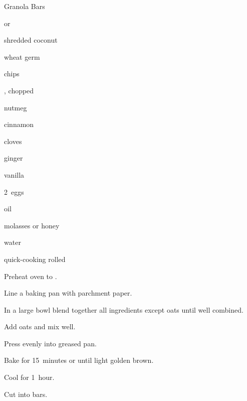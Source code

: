 \begin{recipe}{Granola Bars}{}{}

\begin{ingredients}
\item \C{\half}  or 
\item \C{\half} shredded coconut
\item \C{\quarter} wheat germ
\item \C{\quarter}  chips
\item \C{\quarter} , chopped
\item \tp{\half} nutmeg 
\item \tp{\half} cinnamon 
\item \tp{\half} cloves 
\item \tp{\half} ginger 
\item {} vanilla 
\item 2~eggs
\item \C{\twothird} 
\item {} oil
\item {} molasses or honey
\item \C{\half} water
\item {} quick-cooking rolled 
\end{ingredients}

\begin{directions}
\item Preheat oven to . 
\item Line a  baking pan with parchment paper.
\item In a large bowl blend together all ingredients except oats until well combined.
\item Add oats and mix well.
\item Press evenly into greased pan.
\item Bake for 15~minutes or until light golden brown.
\item Cool for 1~hour. 
\item Cut into bars. 
\end{directions}

\end{recipe}
